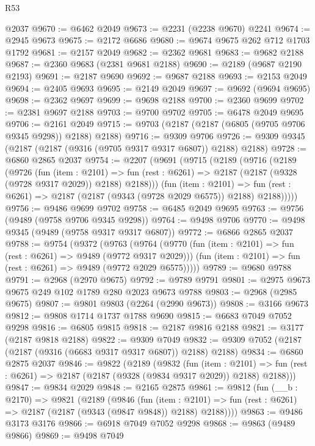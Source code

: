 \begin{lexlean}{R53}
\begin{coremodule}
    @2037
@9670 := @6462 @2049
@9673 := @2231 (@2238 @9670) @2241
@9674 := @2945 @9673
@9675 := @2172 @6686
@9680 := @9674 @9675 @262 @712 @1703 @1792
@9681 := @2157 @2049
@9682 := @2362 @9681
@9683 := @9682 @2188
@9687 := @2360 @9683 (@2381 @9681 @2188)
@9690 := @2189 (@9687 @2190 @2193)
@9691 := @2187 @9690
@9692 := @9687 @2188
@9693 := @2153 @2049
@9694 := @2405 @9693
@9695 := @2149 @2049
@9697 := @9692 (@9694 @9695)
@9698 := @2362 @9697
@9699 := @9698 @2188
@9700 := @2360 @9699
@9702 := @2381 @9697 @2188
@9703 := @9700 @9702
@9705 := @6478 @2049 @9695
@9706 := @2161 @2049
@9715 := @9703 (@2187 (@2187 (@6805 (@9705 @9706 @9345 @9298)) @2188) @2188)
@9716 := @9309 @9706
@9726 := @9309 @9345 (@2187 (@2187 (@9316 (@9705 @9317 @9317 @6807)) @2188) @2188)
@9728 := @6860 @2865 @2037
@9754 := @2207
    (@9691
      (@9715
        (@2189
          (@9716
            (@2189
              (@9726
                (fun (item : @2101) =>
                fun (rest : @6261) => @2187 (@2187 (@9328 (@9728 @9317 @2029)) @2188) @2188)))
            (fun (item : @2101) =>
            fun (rest : @6261) => @2187 (@2187 (@9343 (@9728 @2029 @6575)) @2188) @2188)))))
@9756 := @9486 @9699 @9702
@9758 := @6485 @2049 @9695
@9763 := @9756 (@9489 (@9758 @9706 @9345 @9298))
@9764 := @9498 @9706
@9770 := @9498 @9345 (@9489 (@9758 @9317 @9317 @6807))
@9772 := @6866 @2865 @2037
@9788 := @9754
    (@9372
      (@9763
        (@9764
          (@9770 (fun (item : @2101) => fun (rest : @6261) => @9489 (@9772 @9317 @2029)))
          (fun (item : @2101) => fun (rest : @6261) => @9489 (@9772 @2029 @6575)))))
@9789 := @9680 @9788
@9791 := @2968 (@2970 @9675)
@9792 := @9789 @9791
@9801 := @2975 @9673 @9675 @249 @102 @1789 @280 @2023 @9673 @9788
@9803 := @2968 (@2985 @9675)
@9807 := @9801 @9803 (@2264 (@2990 @9673))
@9808 := @3166 @9673
@9812 := @9808 @1714 @1737 @1788 @9690
@9815 := @6683 @7049 @7052 @9298
@9816 := @6805 @9815
@9818 := @2187 @9816 @2188
@9821 := @3177 (@2187 @9818 @2188)
@9822 := @9309 @7049
@9832 := @9309 @7052 (@2187 (@2187 (@9316 (@6683 @9317 @9317 @6807)) @2188) @2188)
@9834 := @6860 @2875 @2037
@9846 := @9822
    (@2189
      (@9832
        (fun (item : @2101) =>
        fun (rest : @6261) => @2187 (@2187 (@9328 (@9834 @9317 @2029)) @2188) @2188)))
@9847 := @9834 @2029
@9848 := @2165 @2875
@9861 := @9812
    (fun (__b : @2170) =>
    @9821
      (@2189
        (@9846
          (fun (item : @2101) =>
          fun (rest : @6261) => @2187 (@2187 (@9343 (@9847 @9848)) @2188) @2188))))
@9863 := @9486 @3173 @3176
@9866 := @6918 @7049 @7052 @9298
@9868 := @9863 (@9489 @9866)
@9869 := @9498 @7049

\end{coremodule}
\end{lexlean}
